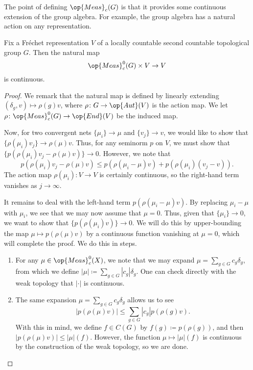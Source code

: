 \documentclass[../notes.tex]{subfiles}
\begin{document}
The point of defining $\op{Meas}_c(G)$ is that it provides some continuous extension of the group algebra. For example, the group algebra has a natural action on any representation.
\begin{lemma}
	Fix a Fr\'echet representation $V$ of a locally countable second countable topological group $G$. Then the natural map
	\[\op{Meas}_c^0(G)\times V\to V\]
	is continuous.
\end{lemma}
\begin{proof}
	We remark that the natural map is defined by linearly extending $(\delta_g,v)\mapsto\rho(g)v$, where $\rho\colon G\to\op{Aut}(V)$ is the action map. We let $\rho\colon\op{Meas}_c^0(G)\to\op{End}(V)$ be the induced map.

	Now, for two convergent nets $\{\mu_i\}\to\mu$ and $\{v_j\}\to v$, we would like to show that $\{\rho(\mu_i)v_j\}\to\rho(\mu)v$. Thus, for any seminorm $p$ on $V$, we must show that $\{p(\rho(\mu_i)v_j-\rho(\mu)v)\}\to0$. However, we note that
	\[p(\rho(\mu_i)v_j-\rho(\mu)v)\le p(\rho(\mu_i-\mu)v)+p(\rho(\mu_i)(v_j-v)).\]
	The action map $\rho(\mu_i)\colon V\to V$ is certainly continuous, so the right-hand term vanishes as $j\to\infty$.
	
	It remains to deal with the left-hand term $p(\rho(\mu_i-\mu)v)$. By replacing $\mu_i-\mu$ with $\mu_i$, we see that we may now assume that $\mu=0$. Thus, given that $\{\mu_i\}\to0$, we want to show that $\{p(\rho(\mu_i)v)\}\to0$. We will do this by upper-bounding the map $\mu\mapsto p(\rho(\mu)v)$ by a continuous function vanishing at $\mu=0$, which will complete the proof. We do this in steps.
	\begin{enumerate}
		\item For any $\mu\in\op{Meas}_c^0(X)$, we note that we may expand $\mu=\sum_{g\in G}c_g\delta_g$, from which we define $\left|\mu\right|\coloneqq\sum_{g\in G}\left|c_g\right|\delta_g$. One can check directly with the weak topology that $\left|\cdot\right|$ is continuous.
		\item The same expansion $\mu=\sum_{g\in G}c_g\delta_g$ allows us to see
		\[\left|p(\rho(\mu)v)\right|\le\sum_{g\in G}\left|c_g\right|p(\rho(g)v).\]
		With this in mind, we define $f\in C(G)$ by $f(g)\coloneqq p(\rho(g))$, and then $\left|p(\rho(\mu)v)\right|\le\left|\mu\right|(f)$. However, the function $\mu\mapsto\left|\mu\right|(f)$ is continuous by the construction of the weak topology, so we are done.
		\qedhere
	\end{enumerate}
\end{proof}
\end{document}
